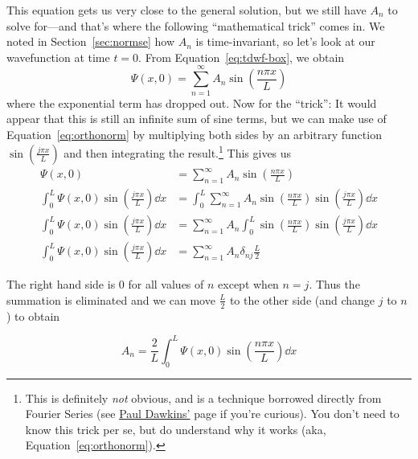 This equation gets us very close to the general solution, but we still have $A_n$ to solve for---and that's where the following ``mathematical trick'' comes in. We noted in Section~\ref{sec:normse} how $A_n$ is time-invariant, so let's look at our wavefunction at time $t=0$. From Equation~\ref{eq:tdwf-box}, we obtain
\begin{equation*}
	\Psi(x,0) = \sum_{n=1}^{\infty} A_n \sin \left(\frac{n\pi x}{L} \right)
\end{equation*}
where the exponential term has dropped out. Now for the ``trick'': It would appear that this is still an infinite sum of sine terms, but we can make use of Equation~\ref{eq:orthonorm} by multiplying both sides by an arbitrary function $\sin \left(\frac{j\pi x}{L}\right)$ and then integrating the result.\footnote{This is definitely \emph{not} obvious, and is a technique borrowed directly from Fourier Series (see \href{http://tutorial.math.lamar.edu/Classes/DE/FourierSeries.aspx}{Paul Dawkins'} page if you're curious). You don't need to know this trick per se, but do understand why it works (aka, Equation~\ref{eq:orthonorm}).} This gives us
\begin{align*}
	\Psi(x,0) &= \sum_{n=1}^{\infty} A_n \sin \left(\frac{n\pi x}{L} \right) \\
	\int_0^L \Psi(x,0) \sin \left(\frac{j \pi x}{L}\right) \dd{x} &= \int_0^L \sum_{n=1}^{\infty} A_n \sin \left(\frac{n\pi x}{L} \right) \sin \left( \frac{j \pi x}{L}\right) \dd{x} \\
	\int_0^L \Psi(x,0) \sin \left(\frac{j \pi x}{L}\right) \dd{x} &= \sum_{n=1}^{\infty} A_n \int_0^L \sin \left(\frac{n\pi x}{L} \right) \sin \left( \frac{j \pi x}{L}\right) \dd{x} \\
	\int_0^L \Psi(x,0) \sin \left(\frac{j \pi x}{L}\right) \dd{x} &= \sum_{n=1}^{\infty} A_n \delta_{nj} \frac{L}{2}
\end{align*}

The right hand side is 0 for all values of $n$ except when $n=j$. Thus the summation is eliminated and we can move $\frac{L}{2}$ to the other side (and change $j$ to $n$) to obtain
\begin{tcolorbox}[title = Wavefunction expansion coefficients] \vspace{-2ex}
	\begin{equation}
		A_n = \frac{2}{L} \int_0^L \Psi(x,0) \sin \left(\frac{n\pi x}{L}\right) \dd{x} \label{eq:wf-coeff}
	\end{equation}
\end{tcolorbox}

